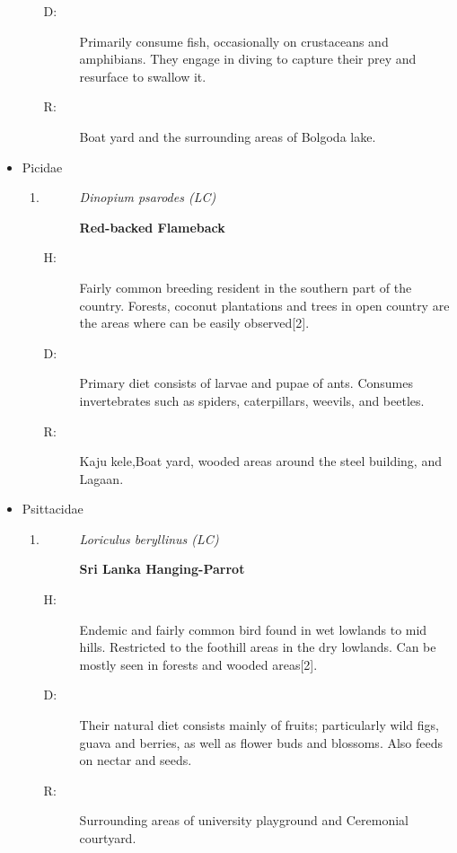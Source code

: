 \begin{itemize}
\begin{enumerate}
\begin{description}
\item[D: ]%
Primarily consume fish, occasionally on crustaceans and amphibians. They engage in diving to capture their prey and resurface to swallow it.%
\item[R: ]%
Boat yard and the surrounding areas of Bolgoda lake.%
\end{description}%
\end{enumerate}%
\item%
Picidae%
\begin{enumerate}%
\item%
\begin{description}%
\item[]%
\textit{Dinopium psarodes (LC)}%
\item[]%
\textbf{Red{-}backed Flameback}%
\end{description}%
\begin{description}%
\item[H: ]%
Fairly common breeding resident in the southern part of the country. Forests, coconut plantations and trees in open country are the areas where can be easily observed{[}2{]}.%
\item[D: ]%
Primary diet consists of larvae and pupae of ants. Consumes invertebrates such as spiders, caterpillars, weevils, and beetles.%
\item[R: ]%
Kaju kele,Boat yard, wooded areas around the steel building, and Lagaan.%
\end{description}%
\end{enumerate}%
\item%
Psittacidae%
\begin{enumerate}%
\item%
\begin{description}%
\item[]%
\textit{Loriculus beryllinus (LC)}%
\item[]%
\textbf{Sri Lanka Hanging{-}Parrot}%
\end{description}%
\begin{description}%
\item[H: ]%
Endemic and fairly common bird found in wet lowlands to mid hills. Restricted to the foothill areas in the dry lowlands. Can be mostly seen in forests and wooded areas{[}2{]}.%
\item[D: ]%
Their natural diet consists mainly of fruits; particularly wild figs, guava and berries, as well as flower buds and blossoms. Also feeds on nectar and seeds.%
\item[R: ]%
Surrounding areas of university playground and Ceremonial courtyard.%

\end{description}
\end{enumerate}
\end{itemize}
